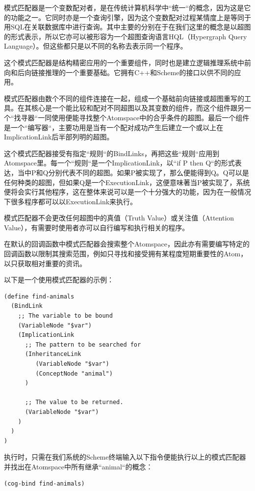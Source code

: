 模式匹配器是一个变数配对者，是在传统计算机科学中“统一“的概念，因为这是它的功能之一。它同时亦是一个查询引擎，因为这个变数配对过程某情度上是等同于用SQL在关联数据库中进行查询。其中主要的分别在于在我们这里的概念是以超图的形式表示，所以它亦可以被形容为一个超图查询语言HQL（Hypergraph Query Language）。但这些都只是以不同的名称去表示同一个程序。

这个模式匹配器是结构精密应用的一个重要组件，同时也是建立逻辑推理系统中前向和后向链接推理的一个重要基础。它拥有C++和Scheme的接口以供不同的应用。

模式匹配器由数个不同的组件连接在一起，组成一个基础前向链接或超图重写的工具。在其核心是一个能比较和配对不同超图以及其变数的组件，而这个组件跟另一个“找寻器“一同使用便能寻找整个Atomspace中的合乎条件的超图。最后一个组件是一个“编写器“，主要功用是当有一个配对成功产生后建立一个或以上在ImplicationLink后半部列明的超图。

这个模式匹配器接受有指定“规则“的BindLinks，再把这些“规则“应用到Atomspace里。每一个“规则“是一个ImplicationLink，以“if P then Q“的形式表达，当中P和Q分别代表不同的超图。如果P被实现了，那么便能得到Q。Q可以是任何种类的超图，但如果Q是一个ExecutionLink，这便意味著当P被实现了，系统便将会实行其他程序，这在整体来说可以是一个十分强大的功能，因为在一般情况下很多程序都可以以ExecutionLink来执行。

模式匹配器不会更改任何超图中的真值（Truth Value）或关注值（Attention Value），有需要时使用者亦可以自行编写和执行相关的程序。

在默认的回调函数中模式匹配器会搜索整个Atomspace，因此亦有需要编写特定的回调函数以限制其搜索范围，例如只寻找和接受拥有某程度短期重要性的Atom，以只获取相对重要的资讯。

以下是一个使用模式匹配器的示例：

\begin{verbatim}
(define find-animals
  (BindLink
    ;; The variable to be bound
    (VariableNode "$var")
    (ImplicationLink
      ;; The pattern to be searched for
      (InheritanceLink
         (VariableNode "$var")
         (ConceptNode "animal")
      )

      ;; The value to be returned.
      (VariableNode "$var")
    )
  )
)
 \end{verbatim}

执行时，只需在我们系统的Scheme终端输入以下指令便能执行以上的模式匹配器并找出在Atomspace中所有继承“animal“的概念：

\begin{verbatim}
(cog-bind find-animals)
\end{verbatim}

